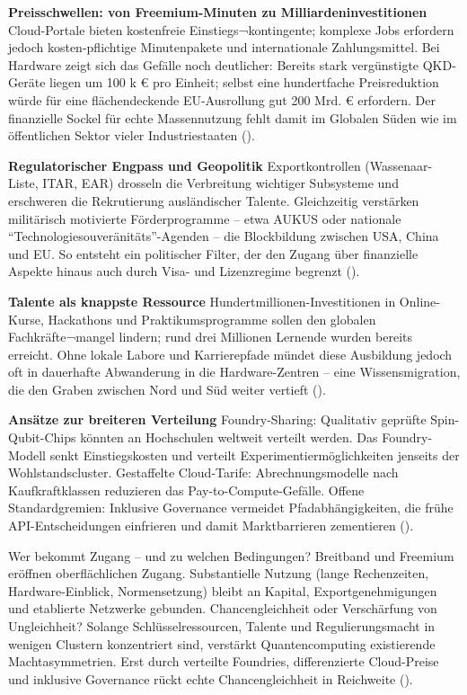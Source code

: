 {\textbf{Preisschwellen: von Freemium-Minuten zu Milliardeninvestitionen}
Cloud-Portale bieten kostenfreie Einstiegs¬kontingente; komplexe Jobs erfordern jedoch kosten-pflichtige Minutenpakete und internationale Zahlungsmittel. Bei Hardware zeigt sich das Gefälle noch deutlicher: Bereits stark vergünstigte QKD-Geräte liegen um 100 k € pro Einheit; selbst eine hundertfache Preisreduktion würde für eine flächendeckende EU-Ausrollung gut 200 Mrd. € erfordern. Der finanzielle Sockel für echte Massennutzung fehlt damit im Globalen Süden wie im öffentlichen Sektor vieler Industriestaaten (\cite{seskirDemocratizationQuantumTechnologies2022}).

\textbf{Regulatorischer Engpass und Geopolitik}
Exportkontrollen (Wassenaar-Liste, ITAR, EAR) drosseln die Verbreitung wichtiger Subsysteme und erschweren die Rekrutierung ausländischer Talente. Gleichzeitig verstärken militärisch motivierte Förderprogramme – etwa AUKUS oder nationale “Technologiesouveränitäts”-Agenden – die Blockbildung zwischen USA, China und EU. So entsteht ein politischer Filter, der den Zugang über finanzielle Aspekte hinaus auch durch Visa- und Lizenzregime begrenzt (\cite{seskirDemocratizationQuantumTechnologies2022}).

\textbf{Talente als knappste Ressource}
Hundertmillionen-Investitionen in Online-Kurse, Hackathons und Praktikumsprogramme sollen den globalen Fachkräfte¬mangel lindern; rund drei Millionen Lernende wurden bereits erreicht. Ohne lokale Labore und Karrierepfade mündet diese Ausbildung jedoch oft in dauerhafte Abwanderung in die Hardware-Zentren – eine Wissensmigration, die den Graben zwischen Nord und Süd weiter vertieft (\cite{seskirDemocratizationQuantumTechnologies2022}).

\textbf{Ansätze zur breiteren Verteilung}
Foundry-Sharing: Qualitativ geprüfte Spin-Qubit-Chips könnten an Hochschulen weltweit verteilt werden. Das Foundry-Modell senkt Einstiegskosten und verteilt Experimentiermöglichkeiten jenseits der Wohlstandscluster.
Gestaffelte Cloud-Tarife: Abrechnungsmodelle nach Kaufkraftklassen reduzieren das Pay-to-Compute-Gefälle.
Offene Standardgremien: Inklusive Governance vermeidet Pfadabhängigkeiten, die frühe API-Entscheidungen einfrieren und damit Marktbarrieren zementieren (\cite{seskirDemocratizationQuantumTechnologies2022}).

Wer bekommt Zugang – und zu welchen Bedingungen? Breitband und Freemium eröffnen oberflächlichen Zugang. Substantielle Nutzung (lange Rechenzeiten, Hardware-Einblick, Normensetzung) bleibt an Kapital, Exportgenehmigungen und etablierte Netzwerke gebunden.
Chancengleichheit oder Verschärfung von Ungleichheit? Solange Schlüsselressourcen, Talente und Regulierungsmacht in wenigen Clustern konzentriert sind, verstärkt Quantencomputing existierende Machtasymmetrien. Erst durch verteilte Foundries, differenzierte Cloud-Preise und inklusive Governance rückt echte Chancengleichheit in Reichweite (\cite{seskirDemocratizationQuantumTechnologies2022}).

}
